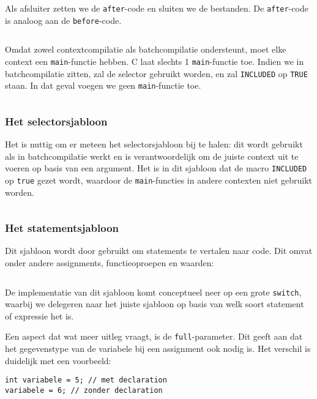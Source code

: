 Als afsluiter zetten we de \texttt{after}-code en sluiten we de bestanden.
De \texttt{after}-code is analoog aan de \texttt{before}-code.

\inputminted[firstline=58,lastline=63]{mako}{sources/c-context.mako}

Omdat \tested{} zowel contextcompilatie als batchcompilatie ondersteunt, moet elke context een \texttt{main}-functie hebben.
C laat slechts 1 \texttt{main}-functie toe.
Indien we in batchcompilatie zitten, zal de selector gebruikt worden, en zal \texttt{INCLUDED} op \texttt{TRUE} staan.
In dat geval voegen we geen \texttt{main}-functie toe.

\inputminted[firstline=65,lastline=69]{mako}{sources/c-context.mako}

\subsubsection{Het selectorsjabloon}

Het is nuttig om er meteen het selectorsjabloon bij te halen: dit wordt gebruikt als \tested{} in batchcompilatie werkt en is verantwoordelijk om de juiste context uit te voeren op basis van een argument.
Het is in dit sjabloon dat de macro \texttt{INCLUDED} op \texttt{true} gezet wordt, waardoor de \texttt{main}-functies in andere contexten niet gebruikt worden.

\inputminted{mako}{sources/c-selector.mako}

\subsubsection{Het statementsjabloon}

Dit sjabloon wordt door \tested{} gebruikt om statements te vertalen naar code.
Dit omvat onder andere assignments, functieoproepen en waarden:

\inputminted{mako}{sources/c-statement.mako}

De implementatie van dit sjabloon komt conceptueel neer op een grote \texttt{switch}, waarbij we delegeren naar het juiste sjabloon op basis van welk soort statement of expressie het is.

Een aspect dat wat meer uitleg vraagt, is de \texttt{full}-parameter.
Dit geeft aan dat het gegevenstype van de variabele bij een assignment ook nodig is.
Het verschil is duidelijk met een voorbeeld:

\begin{verbatim}
int variabele = 5; // met declaration
variabele = 6; // zonder declaration
\end{verbatim}

